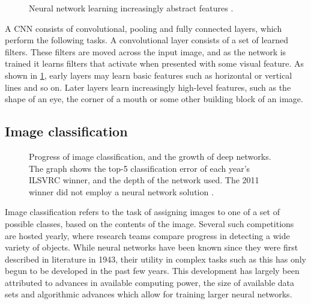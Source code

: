 \documentclass[\rootfolder/main.tex]{subfiles}
\begin{document}
\begin{figure}
    \caption{Neural network learning increasingly abstract features \cite{Brown2015}.\label{fig:abstract-features}}
\end{figure}

A CNN consists of convolutional, pooling and fully connected layers, which perform the following tasks.
A convolutional layer consists of a set of learned filters.
These filters are moved across the input image, and as the network is trained it learns filters that activate when presented with some visual feature.
As shown in \cref{fig:abstract-features}, early layers may learn basic features such as horizontal or vertical lines and so on.
Later layers learn increasingly high-level features, such as the shape of an eye, the corner of a mouth or some other building block of an image.

\subsection{Image classification}

\begin{figure}
    \caption[The influence of deep learning on image classification error rates.]%
            {Progress of image classification, and the growth of deep networks. %
             The graph shows the top-5 classification error of each year's ILSVRC winner, and the depth of the network used. %
             The 2011 winner did not employ a neural network solution
             \cite{Krizhevsky2012}\cite{Zeiler2013}\cite{Szegedy2014}\cite{He2016}.\label{fig:ilsvrc}}
\end{figure}

Image classification refers to the task of assigning images to one of a set of possible classes, based on the contents of the image.
Several such competitions are hosted yearly, where research teams compare progress in detecting a wide variety of objects.
While neural networks have been known since they were first described in literature in 1943\cite{Mitchell1997}\cite{Mcculloch1943}, their utility in complex tasks such as this has only begun to be developed in the past few years.
This development has largely been attributed to advances in available computing power, the size of available data sets and algorithmic advances which allow for training larger neural networks.
\end{document}
